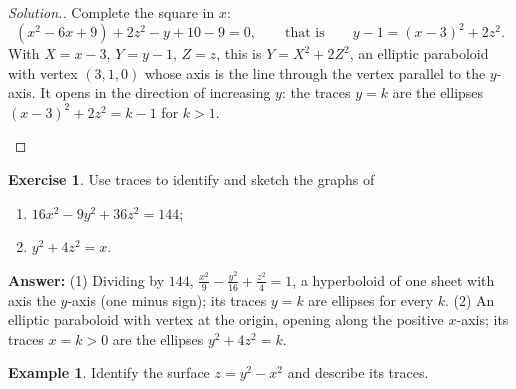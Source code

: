 \documentclass[11pt,a4paper]{article}
\theoremstyle{definition}
\newtheorem{exa}[thm]{Example}
\newtheorem{exe}[thm]{Exercise}
\newenvironment{solution}
  {\renewcommand{\qedsymbol}{}\begin{proof}[\textit{Solution}.]}
  {\end{proof}}
\begin{document}
\begin{solution}
Complete the square in $x$:
\[(x^2 -6x + 9) + 2z^2 -y + 10 -9 =0,\qquad\text{that is}\qquad y-1 = (x-3)^2 +
2z^2 .\]
With $X = x - 3$, $Y = y - 1$, $Z = z$, this is $Y = X^2 + 2Z^2$, an elliptic
paraboloid with vertex $(3,1,0)$ whose axis is the line through the vertex
parallel to the $y$-axis. It opens in the direction of increasing $y$: the
traces $y = k$ are the ellipses $(x-3)^2 + 2z^2 = k - 1$ for $k>1$.

\begin{figure}[H]
\centering
{}
\end{figure}
\end{solution}

\begin{exe}
\label{exe:quadrics}
Use traces to identify and sketch the graphs of
\begin{enumerate}
\item $16x^2 - 9y^2 + 36z^2 = 144$;

\item $y^2 + 4z^2 =x$.
\end{enumerate}

\textbf{Answer:} (1) Dividing by $144$, $\frac{x^2}{9} - \frac{y^2}{16} +
\frac{z^2}{4} = 1$, a hyperboloid of one sheet with axis the $y$-axis (one minus
sign); its traces $y = k$ are ellipses for every $k$. (2) An elliptic paraboloid
with vertex at the origin, opening along the positive $x$-axis; its traces
$x = k>0$ are the ellipses $y^2 + 4z^2 = k$.
\end{exe}

\begin{exa}
\label{ex:saddlesurface}
Identify the surface $z = y^2 - x^2$ and describe its traces.
\end{exa}
\end{document}

